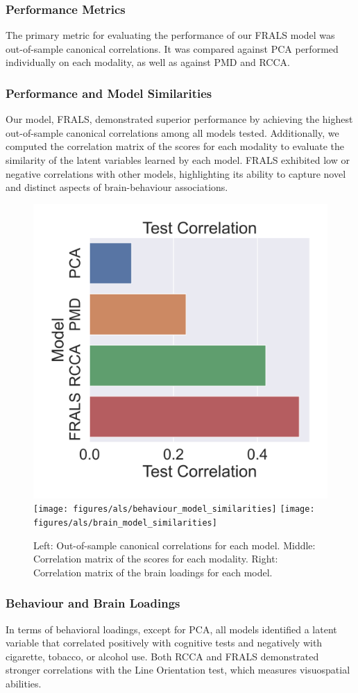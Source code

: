 \subsubsection{Performance Metrics}
The primary metric for evaluating the performance of our FRALS model was out-of-sample canonical correlations.
It was compared against PCA performed individually on each modality, as well as against PMD and RCCA\@.

\subsubsection{Performance and Model Similarities}
Our model, FRALS, demonstrated superior performance by achieving the highest out-of-sample canonical correlations among all models tested.
Additionally, we computed the correlation matrix of the scores for each modality to evaluate the similarity of the latent variables learned by each model.
FRALS exhibited low or negative correlations with other models, highlighting its ability to capture novel and distinct aspects of brain-behaviour associations.

\begin{figure}[h]
\centering
\includegraphics[width=0.32\linewidth]{figures/als/barcorr}
\texttt{[image: figures/als/behaviour\_model\_similarities]}
\texttt{[image: figures/als/brain\_model\_similarities]}
\caption{Left: Out-of-sample canonical correlations for each model. Middle: Correlation matrix of the scores for each modality. Right: Correlation matrix of the brain loadings for each model.}
\label{fig:performance}
\end{figure}

\subsubsection{Behaviour and Brain Loadings}
In terms of behavioral loadings, except for PCA, all models identified a latent variable that correlated positively with cognitive tests and negatively with cigarette, tobacco, or alcohol use.
Both RCCA and FRALS demonstrated stronger correlations with the Line Orientation test, which measures visuospatial abilities.

